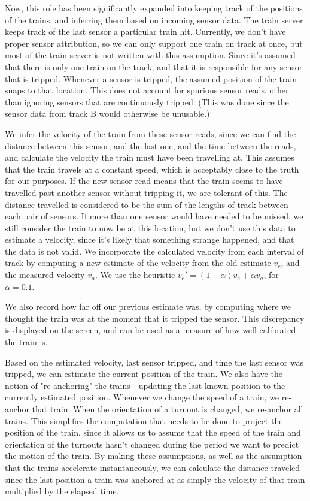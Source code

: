 \documentclass[titlepage]{article}
\begin{document}
Now, this role has been significantly expanded into keeping track of the
positions of the trains, and inferring them based on incoming sensor data.
The train server keeps track of the last sensor a particular train hit.
Currently, we don't have proper sensor attribution, so we can only support
one train on track at once, but most of the train server is not written with
this assumption.
Since it's assumed that there is only one train on the track, and that
it is responsible for any sensor that is tripped.
Whenever a sensor is tripped, the assumed position of the train snaps to that
location.
This does not account for spurious sensor reads, other than ignoring
sensors that are continuously tripped.
(This was done since the sensor data from track B would otherwise be unusable.)

We infer the velocity of the train from these sensor reads, since we can
find the distance between this sensor, and the last one, and the time between
the reads, and calculate the velocity the train must have been travelling at.
This assumes that the train travels at a constant speed, which is acceptably
close to the truth for our purposes.
If the new sensor read means that the train seems to have travelled past
another sensor without tripping it, we are tolerant of this.
The distance travelled is considered to be the sum of the lengths of track
between each pair of sensors.
If more than one sensor would have needed to be missed, we still consider the
train to now be at this location, but we don't use this data to estimate
a velocity, since it's likely that something strange happened, and that
the data is not valid.
We incorporate the calculated velocity from each interval of track by computing
a new estimate of the velocity from the old estimate $v_e$, and the measured
velocity $v_a$.
We use the heuristic $v_e' = (1 - \alpha) v_e + \alpha v_a$, for $\alpha = 0.1$.

We also record how far off our previous estimate was, by computing where
we thought the train was at the moment that it tripped the sensor.
This discrepancy is displayed on the screen, and can be used as a measure of
how well-calibrated the train is.

Based on the estimated velocity, last sensor tripped, and time the last sensor
was tripped, we can estimate the current position of the train.
We also have the notion of "re-anchoring" the trains - updating the last
known position to the currently estimated position.
Whenever we change the speed of a train, we re-anchor that train.
When the orientation of a turnout is changed, we re-anchor all trains.
This simplifies the computation that needs to be done to project the position
of the train, since it allows us to assume that the speed of the train and
orientation of the turnouts hasn't changed during the period we want to predict
the motion of the train.
By making these assumptions, as well as the assumption that the trains accelerate
instantaneously, we can calculate the distance traveled since the last position
a train was anchored at as simply the velocity of that train multiplied by
the elapsed time.
\end{document}
